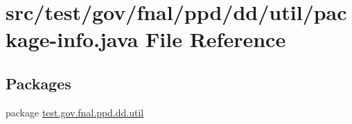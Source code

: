 \hypertarget{test_2gov_2fnal_2ppd_2dd_2util_2package-info_8java}{\section{src/test/gov/fnal/ppd/dd/util/package-\/info.java File Reference}
\label{test_2gov_2fnal_2ppd_2dd_2util_2package-info_8java}
}
\subsection*{Packages}
\begin{DoxyCompactItemize}
\item 
package \hyperlink{namespacetest_1_1gov_1_1fnal_1_1ppd_1_1dd_1_1util}{test.\-gov.\-fnal.\-ppd.\-dd.\-util}
\end{DoxyCompactItemize}
